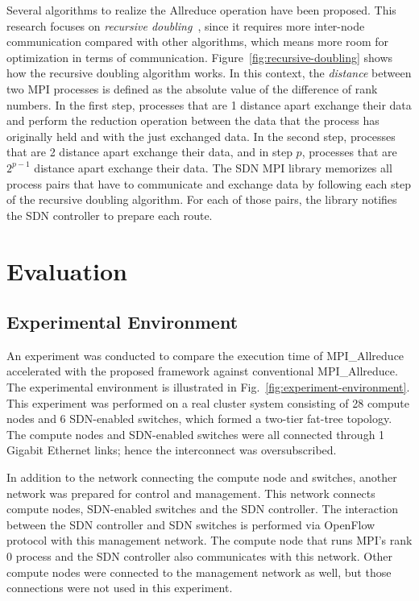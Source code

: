 Several algorithms to realize the Allreduce operation have been proposed.
This research focuses on \emph{recursive doubling}~\autocite{Thakur2005},
since it requires more inter-node communication compared with other
algorithms, which means more room for optimization in terms of communication.
Figure~\ref{fig:recursive-doubling} shows how the recursive doubling algorithm
works. In this context, the \emph{distance} between two MPI processes is
defined as the absolute value of the difference of rank numbers. In the first
step, processes that are 1 distance apart exchange their data and perform the
reduction operation between the data that the process has originally held and
with the just exchanged data. In the second step, processes that are 2
distance apart exchange their data, and in step \(p\), processes that are
\(2^{p - 1}\) distance apart exchange their data. The SDN MPI library
memorizes all process pairs that have to communicate and exchange data by
following each step of the recursive doubling algorithm. For each of those
pairs, the library notifies the SDN controller to prepare each route.

\section{Evaluation}\label{sec:iii-evaluation}

\subsection{Experimental Environment}

An experiment was conducted to compare the execution time of MPI\_Allreduce
accelerated with the proposed framework against conventional
MPI\_Allreduce. The experimental environment is illustrated in
Fig.~\ref{fig:experiment-environment}. This experiment was performed on
a real cluster system consisting of 28 compute nodes and 6 SDN-enabled
switches, which formed a two-tier fat-tree topology. The compute nodes and
SDN-enabled switches were all connected through 1 Gigabit Ethernet links;
hence the interconnect was oversubscribed.

In addition to the network connecting the compute node and switches,
another network was prepared for control and management. This network
connects compute nodes, SDN-enabled switches and the SDN controller.
The interaction between the SDN controller and SDN switches is performed
via OpenFlow protocol with this management network. The compute node
that runs MPI's rank 0 process and the SDN controller also communicates
with this network. Other compute nodes were connected to the
management network as well, but those connections were not used in this
experiment.

